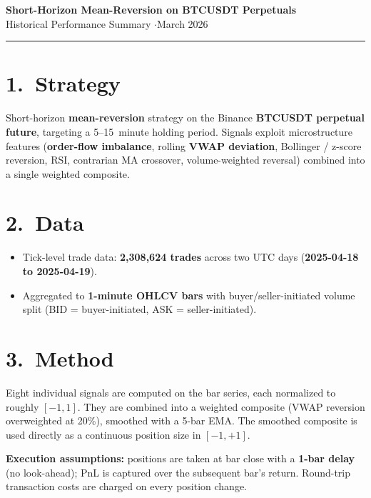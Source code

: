 \documentclass[10pt,a4paper]{article}
\begin{document}
\begin{center}
  {\large\bfseries Short-Horizon Mean-Reversion on BTCUSDT Perpetuals}\\[1pt]
  {\footnotesize Historical Performance Summary \quad$\cdot$\quad March 2026}
\end{center}

\vspace{6pt}\hrule\vspace{6pt}

\section*{1.\ Strategy}
Short-horizon \textbf{mean-reversion} strategy on the Binance \textbf{BTCUSDT perpetual future},
targeting a 5--15~minute holding period. Signals exploit microstructure features
(\textbf{order-flow imbalance}, rolling \textbf{VWAP deviation}, Bollinger / z-score reversion,
RSI, contrarian MA crossover, volume-weighted reversal) combined into a single
weighted composite.

\section*{2.\ Data}
\begin{itemize}[leftmargin=1.2em, itemsep=0pt, topsep=2pt]
  \item Tick-level trade data: \textbf{2{,}308{,}624 trades} across two UTC days
        (\textbf{2025-04-18 to 2025-04-19}).
  \item Aggregated to \textbf{1-minute OHLCV bars} with buyer/seller-initiated
        volume split (BID = buyer-initiated, ASK = seller-initiated).
\end{itemize}

\section*{3.\ Method}
Eight individual signals are computed on the bar series, each normalized to roughly
$[-1,1]$. They are combined into a weighted composite (VWAP reversion overweighted at 20\%),
smoothed with a 5-bar EMA. The smoothed composite is used directly as a continuous
position size in $[-1, +1]$.

\textbf{Execution assumptions:} positions are taken at bar close with a \textbf{1-bar
delay} (no look-ahead); PnL is captured over the subsequent bar's return. Round-trip
transaction costs are charged on every position change.
\end{document}
